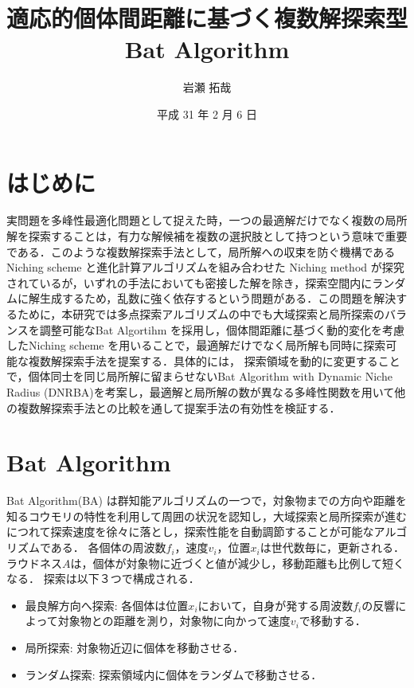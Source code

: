 \documentclass[twocolumn, a4paper]{UECIEresume}
\title{適応的個体間距離に基づく複数解探索型Bat Algorithm}
\date{平成 31 年 2 月 6 日}
\affiliation{情報学専攻 メディア情報学 プログラム}
\author{岩瀬 拓哉}
\begin{document}
\maketitle

\section{はじめに}
実問題を多峰性最適化問題として捉えた時，一つの最適解だけでなく複数の局所解を探索することは，有力な解候補を複数の選択肢として持つという意味で重要である．このような複数解探索手法として，局所解への収束を防ぐ機構であるNiching scheme と進化計算アルゴリズムを組み合わせた Niching method が探究されているが，いずれの手法においても密接した解を除き，探索空間内にランダムに解生成するため，乱数に強く依存するという問題がある．この問題を解決するために，本研究では多点探索アルゴリズムの中でも大域探索と局所探索のバランスを調整可能なBat Algortihm を採用し，個体間距離に基づく動的変化を考慮したNiching scheme を用いることで，最適解だけでなく局所解も同時に探索可能な複数解探索手法を提案する．具体的には，
探索領域を動的に変更することで，個体同士を同じ局所解に留まらせないBat Algorithm with Dynamic Niche Radius (DNRBA)を考案し，最適解と局所解の数が異なる多峰性関数を用いて他の複数解探索手法との比較を通して提案手法の有効性を検証する．

\section{Bat Algorithm}
Bat Algorithm(BA) \cite{BA}は群知能アルゴリズムの一つで，対象物までの方向や距離を知るコウモリの特性を利用して周囲の状況を認知し，大域探索と局所探索が進むにつれて探索速度を徐々に落とし，探索性能を自動調節することが可能なアルゴリズムである．
各個体の周波数${f_i}$，速度${v_i}$，位置${x_i}$は世代数毎に，更新される．
ラウドネス${A}$は，個体が対象物に近づくと値が減少し，移動距離も比例して短くなる．
探索は以下３つで構成される．
\begin{itemize}
\item 最良解方向へ探索: 各個体は位置${x_i}$において，自身が発する周波数${f_i}$の反響によって対象物との距離を測り，対象物に向かって速度${v_i}$で移動する．
\item 局所探索: 対象物近辺に個体を移動させる．
\item ランダム探索: 探索領域内に個体をランダムで移動させる．
\end{itemize}
\end{document}
